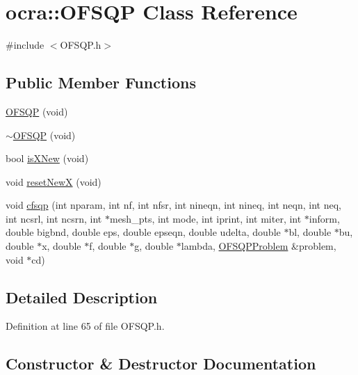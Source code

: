 \hypertarget{classocra_1_1OFSQP}{}\section{ocra\+:\+:O\+F\+S\+QP Class Reference}
\label{classocra_1_1OFSQP}


{\ttfamily \#include $<$O\+F\+S\+Q\+P.\+h$>$}

\subsection*{Public Member Functions}
\begin{DoxyCompactItemize}
\item 
\hyperlink{classocra_1_1OFSQP_a1621f5bd0da2395a5553e821cba0006e}{O\+F\+S\+QP} (void)
\item 
\hyperlink{classocra_1_1OFSQP_abc15e89ba836e714e10b1589f460e759}{$\sim$\+O\+F\+S\+QP} (void)
\item 
bool \hyperlink{classocra_1_1OFSQP_adf678d1abdee7d5d337cf3698357108f}{is\+X\+New} (void)
\item 
void \hyperlink{classocra_1_1OFSQP_addab1dbba87610a532df2f0a279629be}{reset\+NewX} (void)
\item 
void \hyperlink{classocra_1_1OFSQP_a235aa352025c37af78fc18c28991d18e}{cfsqp} (int nparam, int nf, int nfsr, int nineqn, int nineq, int neqn, int neq, int ncsrl, int ncsrn, int $\ast$mesh\+\_\+pts, int mode, int iprint, int miter, int $\ast$inform, double bigbnd, double eps, double epseqn, double udelta, double $\ast$bl, double $\ast$bu, double $\ast$x, double $\ast$f, double $\ast$g, double $\ast$lambda, \hyperlink{classocra_1_1OFSQPProblem}{O\+F\+S\+Q\+P\+Problem} \&problem, void $\ast$cd)
\end{DoxyCompactItemize}


\subsection{Detailed Description}


Definition at line 65 of file O\+F\+S\+Q\+P.\+h.



\subsection{Constructor \& Destructor Documentation}
\hypertarget{classocra_1_1OFSQP_a1621f5bd0da2395a5553e821cba0006e}{}\label{classocra_1_1OFSQP_a1621f5bd0da2395a5553e821cba0006e} 
